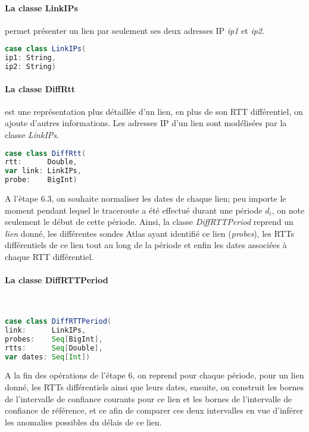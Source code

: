 \paragraph{La classe LinkIPs} permet présenter un lien par seulement ses deux adresses IP \textit{ip1} et \textit{ip2}.
\begin{lstlisting}[language=scala]
case class LinkIPs(
ip1: String,
ip2: String)
\end{lstlisting}

\paragraph{La classe DiffRtt} est une représentation plus détaillée d'un lien, en plus de son RTT différentiel, on ajoute d'autres informations.  Les adresses IP d'un lien sont modélisées par la classe \textit{LinkIPs}.

\begin{lstlisting}[language=scala]
case class DiffRtt(
rtt:      Double,
var link: LinkIPs,
probe:    BigInt)
\end{lstlisting}

A l'étape 6.3, on souhaite normaliser les dates de chaque lien; peu importe le moment pendant lequel le traceroute a été effectué durant une période $d_i$, on note seulement le début de cette période. Ainsi,  la classe  \textit{DiffRTTPeriod}  reprend un \textit{lien} donné, les différentes sondes Atlas ayant identifié ce lien (\textit{probes}), les RTTs différentiels de ce lien tout au long de la période et enfin les dates associées à chaque RTT différentiel.
\paragraph{La classe DiffRTTPeriod } ~
\begin{lstlisting}[language=scala]
case class DiffRTTPeriod(
link:      LinkIPs,
probes:    Seq[BigInt],
rtts:      Seq[Double],
var dates: Seq[Int])
\end{lstlisting}

A la fin des opérations de l'étape 6, on reprend pour chaque période, pour un lien donné, les RTTs différentiels ainsi que leurs dates, ensuite, on construit les bornes de l'intervalle de confiance courants pour ce lien et les bornes de l'intervalle de confiance de référence, et ce afin de comparer ces deux intervalles en vue d'inférer les anomalies possibles du délais de ce lien.


